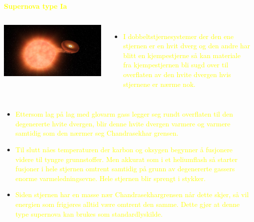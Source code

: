 \documentclass{beamer}
\newcommand{\pagebutton}[1]{\setbeamertemplate{button}{\tikz\node[inner xsep = 5pt, draw = structure!90, fill = green(ryb), rounded corners = 8pt]{\color{amber}\Large\insertbuttontext};}\beamerbutton{#1}}
\begin{document}
\begin{frame}
{
\textcolor{yellow}{{\Large\bf Supernova type Ia }}
\begin{columns}
\centerline{\includegraphics[scale=0.07]{media/SNIa.jpg}}
{\small
\begin{itemize}
\item \textcolor{yellow}{I dobbeltstjernesystemer der den ene stjernen er en hvit dverg og den andre har blitt en kjempestjerne så kan materiale fra kjempestjernen bli sugd over til overflaten av den hvite dvergen hvis stjernene er nærme nok. }
\end{itemize}
}
\end{columns}
{\small
\begin{itemize}
\item \textcolor{yellow}{Ettersom lag på lag med glovarm gass legger seg rundt overflaten til den degenererte hvite dvergen, blir denne hvite dvergen varmere og varmere samtidig som den nærmer seg Chandrasekhar grensen.}
\item \textcolor{yellow}{Til slutt nåes temperaturen der karbon og oksygen begynner å fusjonere videre til tyngre grunnstoffer. Men akkurat som i et heliumflash så starter fusjoner i hele stjernen omtrent samtidig på grunn av degenererte gassers enorme varmeledningsevne. Hele stjernen blir sprengt i stykker.}
\item \textcolor{yellow}{Siden stjernen har en masse nær Chandrasekhargrensen når dette skjer, så vil energien som frigjøres alltid være omtrent den samme. Dette gjør at denne type supernova kan brukes som standardlyskilde.}
\end{itemize}
}
\hyperlink{feil_nd4}{\pagebutton{SIDE 54/54/54}}}





{

}
\end{frame}
\end{document}
